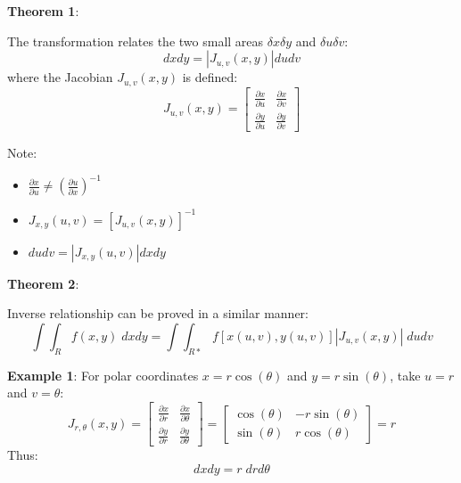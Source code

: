\documentclass[10pt,a4paper]{article}
\begin{document}
\begin{tcolorbox}[breakable,colback=white]
    \textbf{Theorem 1}:

    The transformation relates the two small areas $\delta x \delta y$ and $\delta u \delta v$:
    $$
        dxdy = |J_{u,v}(x,y)| dudv
    $$
    where the Jacobian $J_{u,v}(x,y)$ is defined:
    $$
        J_{u,v}(x,y) = 
        \begin{bmatrix}
            \frac{\partial x}{\partial u} & \frac{\partial x}{\partial v} \\
            \frac{\partial y}{\partial u} & \frac{\partial y}{\partial v}
        \end{bmatrix}
    $$

    Note: 
    \begin{itemize}
        \item $\frac{\partial x}{\partial u} \neq \left(\frac{\partial u}{\partial x}\right)^{-1}$
        \item $J_{x,y}(u,v) = \left[J_{u,v}(x,y)\right]^{-1}$
        \item $dudv = |J_{x,y}(u,v)|dxdy$
    \end{itemize}
\end{tcolorbox}

\begin{tcolorbox}[breakable,colback=white]
\textbf{Theorem 2}: 

Inverse relationship can be proved in a similar manner:
$$
    \int \int_R f(x,y)\; dxdy = \int \int_{R*} f[x(u,v),y(u,v)]|J_{u,v}(x,y)|\; dudv
$$
\end{tcolorbox}

\textbf{Example 1}: For polar coordinates $x=r\cos(\theta)$ and $y=r\sin(\theta)$, take $u=r$ and
$v=\theta$:
$$
    J_{r,\theta}(x,y) = 
    \begin{bmatrix}
        \frac{\partial x}{\partial r} & \frac{\partial x}{\partial \theta} \\
        \frac{\partial y}{\partial r} & \frac{\partial y}{\partial \theta} 
    \end{bmatrix} = 
    \begin{bmatrix}
        \cos(\theta) & -r\sin(\theta) \\
        \sin(\theta) & r\cos(\theta)
    \end{bmatrix} = r
$$
Thus:
$$
    dxdy = r\; drd\theta
$$
\end{document}
